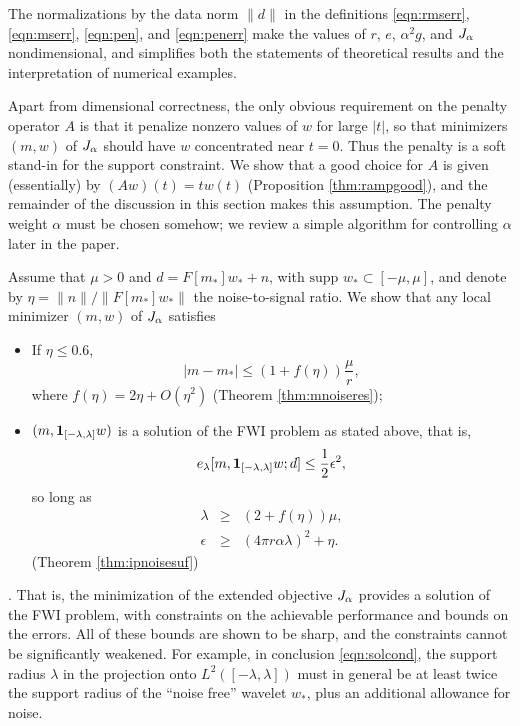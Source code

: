 The normalizations by the data norm $\|d\|$ in the definitions
\ref{eqn:rmserr}, \ref{eqn:mserr}, \ref{eqn:pen}, and \ref{eqn:penerr} make the values
of $r$, $e$, $\alpha^2 g$, and $J_{\alpha}$ nondimensional, and simplifies
both the statements of theoretical results and the interpretation of
numerical examples.

Apart from dimensional correctness, the only obvious requirement on the penalty operator $A$ is that it
penalize 
nonzero values of $w$ for large $|t|$, so that minimizers $(m,w)$ of
$J_{\alpha}$ should have $w$
concentrated near $t=0$. Thus the penalty is a soft stand-in for the
support constraint. We
show that a good choice for $A$ is given (essentially) by
$(Aw)(t)=tw(t)$ (Proposition \ref{thm:rampgood}), and the
remainder of the discussion in this section makes this assumption. The
penalty weight $\alpha$ must be chosen somehow; we review a simple
algorithm for controlling $\alpha$ later in the paper.

Assume that $\mu>0$ and $d = F[m_*]w_* + n$, with $\mbox{supp }w_*
\subset [-\mu,\mu]$, and denote by $\eta = \|n\|/\|F[m_*]w_*\|$
the noise-to-signal ratio. We show that any local minimizer $(m,w)$
of $J_{\alpha}$ satisfies 
\begin{itemize}
\item If $\eta \le 0.6$,
  \begin{equation}
    \label{eqn:mbnd}
    |m-m_*| \le (1+f(\eta))\frac{\mu}{r},
  \end{equation}
  where $f(\eta)=2\eta+O(\eta^2)$ (Theorem \ref{thm:mnoiseres});
\item 
  $(m,{\bf 1}_{[-\lambda,\lambda]}w)$ is a solution of the FWI problem
  as stated above, that is,
  \begin{equation}
    \label{eqn:success}
    e_{\lambda}[m, {\bf 1}_{[-\lambda,\lambda]}w;d] \le \frac{1}{2}\epsilon^2,
  \end{equation}
  so long as
  \begin{eqnarray}
    \lambda & \ge & (2+f(\eta))\mu,\nonumber\\
    \epsilon &\ge & (4\pi r \alpha \lambda)^2 +\eta.
    \label{eqn:solcond}
  \end{eqnarray}
  (Theorem \ref{thm:ipnoisesuf})
\end{itemize}.
That is, the minimization of the extended objective $J_{\alpha}$ provides a
solution of the FWI problem, with constraints on the achievable
performance and bounds on the errors. All of these
bounds are shown to be sharp, and the constraints cannot be
significantly weakened. For example, in conclusion \ref{eqn:solcond}, the support radius $\lambda$ in
the projection onto $L^2([-\lambda,\lambda])$ must in general be at least twice the
support radius of the ``noise free'' wavelet $w_*$, plus an additional
allowance for noise.

